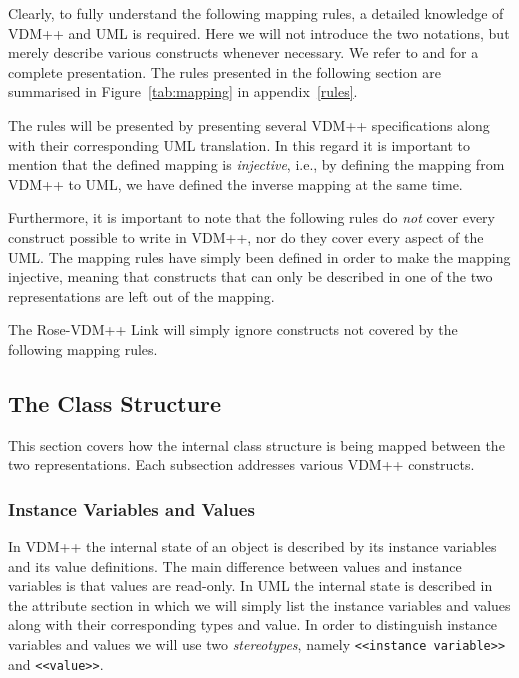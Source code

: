 \documentclass[\pformat,12pt]{article}
\newcommand{\vdmpp}{VDM++}
\newcommand{\link}{Rose-\vdmpp{} Link}
\begin{document}
Clearly, to fully understand the following mapping rules, a detailed knowledge of \vdmpp{}   
and UML is required. Here we will not introduce the two notations, but merely describe   
various constructs whenever necessary. We refer to \cite{LangManPP-SCSK} and \cite{Booch&97} for a   
complete presentation.  
The rules presented in the following section are summarised in Figure~\ref{tab:mapping} in appendix~\ref{rules}.  

The rules will be presented by presenting several \vdmpp{}
specifications along with their corresponding UML translation. In this
regard it is important to mention that the defined mapping is {\it
  injective}, i.e., by defining the mapping from \vdmpp{} to UML, we
have defined the inverse mapping at the same time.
 
Furthermore, it is important to note that the following rules do {\it not} cover every construct   
possible to write in \vdmpp{}, nor do they cover every aspect of the UML. The mapping   
rules have simply been defined in order to make the mapping injective, meaning that   
constructs that can only be described in one of the two representations are left out of the   
mapping.  

The \link{} will simply ignore constructs not covered by the following   
mapping rules.  

\subsection{The Class Structure}
\label{classstructure}
  
This section covers how the internal class structure is being mapped between the two   
representations. Each subsection addresses various \vdmpp{} constructs.  

\subsubsection*{Instance Variables and Values}
  
In \vdmpp{} the internal state of an object is described by its instance variables and its value   
definitions. The main difference between values and instance variables is that values are   
read-only. In UML the internal state is described in the attribute section in which we will   
simply list the instance variables and values along with their corresponding types and   
value. In order to distinguish instance variables and values we will use two {\it stereotypes},   
namely {\tt <<instance variable>>} and {\tt <<value>>}.  
\end{document}
